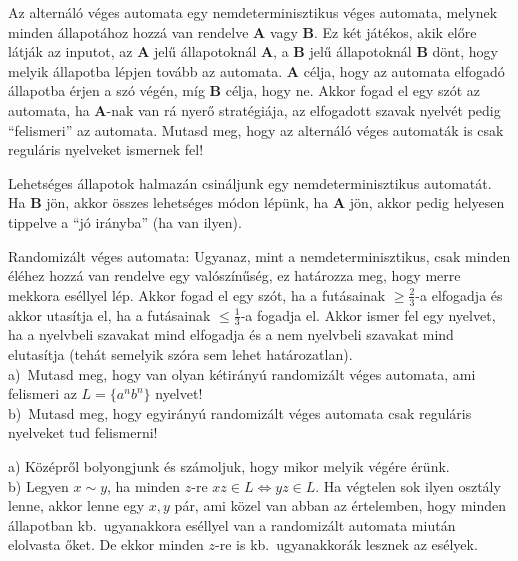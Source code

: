 \begin{Exercise}[counter={sorszam}, difficulty=1]
	 Az altern\'al\'o v\'eges automata egy nemdeterminisztikus v\'eges automata, melynek minden állapotához hozzá van rendelve {\bf A} vagy {\bf B}. Ez két játékos, akik előre látják az inputot, az {\bf A} jelű állapotoknál {\bf A}, a {\bf B} jelű állapotoknál {\bf B} dönt, hogy melyik állapotba lépjen tovább az automata. {\bf A} célja, hogy az automata elfogadó állapotba érjen a szó végén, míg {\bf B} célja, hogy ne. Akkor fogad el egy szót az automata, ha {\bf A}-nak van rá nyerő stratégiája, az elfogadott szavak nyelvét pedig ``felismeri'' az automata. Mutasd meg, hogy az altern\'al\'o v\'eges automaták is csak reguláris nyelveket ismernek fel!
\end{Exercise}	 
\begin{Answer}
	Lehets\'eges \'allapotok halmaz\'an csin\'aljunk egy nemdeterminisztikus automat\'at. Ha {\bf B} j\"on, akkor \"osszes lehets\'eges m\'odon l\'ep\"unk, ha {\bf A} j\"on, akkor pedig helyesen tippelve a ``j\'o ir\'anyba'' (ha van ilyen).
\end{Answer}


\begin{Exercise}[counter={sorszam}, difficulty=0] Randomizált véges automata: Ugyanaz, mint a nemdeterminisztikus, csak minden éléhez hozz\'a van rendelve egy valószínűség, ez határozza meg, hogy merre mekkora eséllyel lép. Akkor fogad el egy szót, ha a futásainak $\ge\frac{2}{3}$-a elfogadja és akkor utasítja el, ha a futásainak $\le\frac{1}{3}$-a fogadja el. Akkor ismer fel egy nyelvet, ha a nyelvbeli szavakat mind elfogadja és a nem nyelvbeli szavakat mind elutasítja (tehát semelyik szóra sem lehet határozatlan).\\
a)~\hard Mutasd meg, hogy van olyan kétirányú randomizált véges automata, ami felismeri az $L=\{a^nb^n\}$ nyelvet!\\
b)~\veryhard Mutasd meg, hogy egyirányú randomizált véges automata csak reguláris nyelveket tud felismerni!
\end{Exercise}
\begin{Answer}
	a) K\"oz\'epr\H ol bolyongjunk \'es sz\'amoljuk, hogy mikor melyik v\'eg\'ere \'er\"unk.\\
	b) Legyen $x\sim y$, ha minden $z$-re $xz\in L \Leftrightarrow yz\in L$. Ha v\'egtelen sok ilyen oszt\'aly lenne, akkor lenne egy $x,y$ p\'ar, ami k\"ozel van abban az \'ertelemben, hogy minden \'allapotban kb.\ ugyanakkora es\'ellyel van a randomiz\'alt automata miut\'an elolvasta \H oket. De ekkor minden $z$-re is kb.\ ugyanakkor\'ak lesznek az es\'elyek.
\end{Answer}









